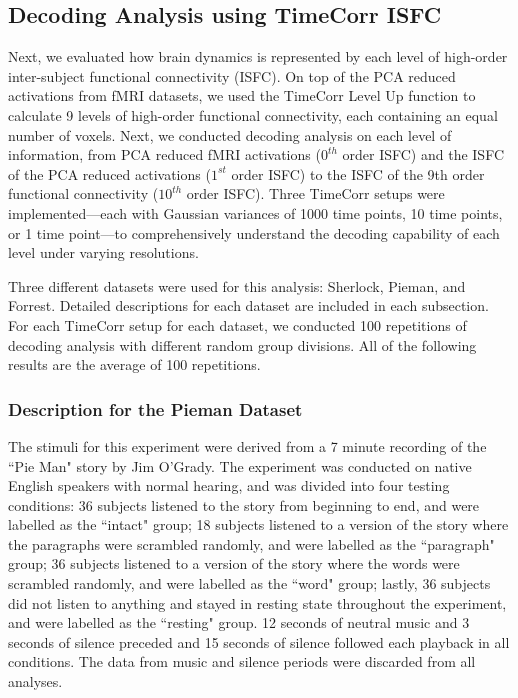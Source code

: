 \documentclass[11pt]{article}
\begin{document}
\subsection{Decoding Analysis using TimeCorr ISFC}
Next, we evaluated how brain dynamics is represented by each level of high-order inter-subject functional connectivity (ISFC). On top of the PCA reduced activations from fMRI datasets, we used the TimeCorr Level Up function to calculate 9 levels of high-order functional connectivity, each containing an equal number of voxels. Next, we conducted decoding analysis on each level of information, from PCA reduced fMRI activations ($0^{th}$ order ISFC) and the ISFC of the PCA reduced activations ($1^{st}$ order ISFC) to the ISFC of the 9th order functional connectivity ($10^{th}$ order ISFC). Three TimeCorr setups were implemented---each with Gaussian variances of 1000 time points, 10 time points, or 1 time point---to comprehensively understand the decoding capability of each level under varying resolutions.

Three different datasets were used for this analysis: Sherlock, Pieman, and Forrest. Detailed descriptions for each dataset are included in each subsection. For each TimeCorr setup for each dataset, we conducted 100 repetitions of decoding analysis with different random group divisions. All of the following results are the average of 100 repetitions.

\subsubsection{Description for the Pieman Dataset}

The stimuli for this experiment were derived from a 7 minute recording of the ``Pie Man" story by Jim O'Grady. The experiment was conducted on native English speakers with normal hearing, and was divided into four testing conditions: 36 subjects listened to the story from beginning to end, and were labelled as the ``intact" group; 18 subjects listened to a version of the story where the paragraphs were scrambled randomly, and were labelled as the ``paragraph" group; 36 subjects listened to a version of the story where the words were scrambled randomly, and were labelled as the ``word" group; lastly, 36 subjects did not listen to anything and stayed in resting state throughout the experiment, and were labelled as the ``resting" group. 12 seconds of neutral music and 3 seconds of silence preceded and 15 seconds of silence followed each playback in all conditions. The data from music and silence periods were discarded from all analyses.\cite{hasson2016}
\end{document}
